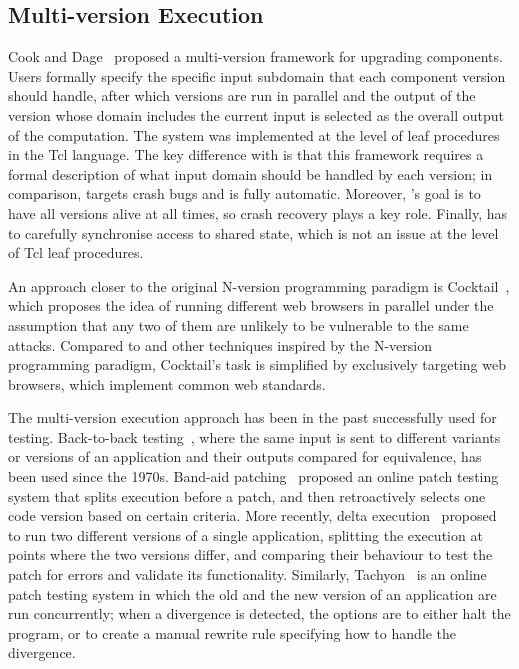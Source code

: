 \subsection{Multi-version Execution}

Cook and Dage~\cite{cook:icse99} proposed a multi-version framework for
upgrading components.  Users formally specify the specific input subdomain that
each component version should handle, after which versions are run in parallel
and the output of the version whose domain includes the current input is
selected as the overall output of the computation.  The system was implemented
at the level of leaf procedures in the Tcl language.  The key difference with
\mx is that this framework requires a formal description of what input domain
should be handled by each version; in comparison, \mx targets crash bugs and is
fully automatic.  Moreover, \mx's goal is to have all versions alive at all
times, so crash recovery plays a key role.  Finally, \mx has to carefully
synchronise access to shared state, which is not an issue at the level of Tcl
leaf procedures.

An approach closer to the original N-version programming paradigm is
Cocktail~\cite{cocktail}, which proposes the idea of running different web
browsers in parallel under the assumption that any two of them are unlikely to
be vulnerable to the same attacks.  Compared to \mx and other techniques
inspired by the N-version programming paradigm, Cocktail's task is simplified
by exclusively targeting web browsers, which implement common web standards.


The multi-version execution approach has been in the past successfully used for
testing. Back-to-back testing~\cite{back-to-back90}, where the same input is
sent to different variants or versions of an application and their outputs
compared for equivalence, has been used since the 1970s.  Band-aid
patching~\cite{bandaid-patch07} proposed an online patch testing system that
splits execution before a patch, and then retroactively selects one code
version based on certain criteria.  More recently, delta
execution~\cite{onlinevalidation} proposed to run two different versions of a
single application, splitting the execution at points where the two versions
differ, and comparing their behaviour to test the patch for errors and validate
its functionality.  Similarly, Tachyon~\cite{tachyon12} is an online patch
testing system
in which the old and the new version of an application are run concurrently;
when a divergence is detected, the options are to either halt the program, or
to create a manual rewrite rule specifying how to handle the divergence.

